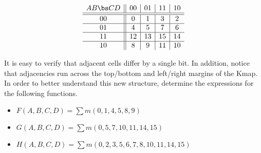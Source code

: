 $$
\begin{array} {c||c|c|c|c}
AB \bs CD & 00 & 01 & 11 & 10 \\ \hline \hline
00        & 0  & 1  & 3  & 2  \\ \hline
01        & 4  & 5  & 7  & 6  \\ \hline
11        & 12 & 13 & 15 & 14 \\ \hline
10        & 8  & 9  & 11 & 10 \\
\end{array} $$

It is easy to verify that adjacent cells differ by a single bit.
In addition, notice that adjacencies run across the top/bottom
and left/right margins of the Kmap.  In order to better
understand this new structure, determine the \SOPmin
expressions for the following functions.

\begin{itemize}
\item $F(A,B,C,D) = \sum m(0,1,4,5,8,9)$
\item $G(A,B,C,D) = \sum m(0,5,7,10,11,14,15)$
\item $H(A,B,C,D) = \sum m(0,2,3,5,6,7,8,10,11,14,15)$
\end{itemize}

